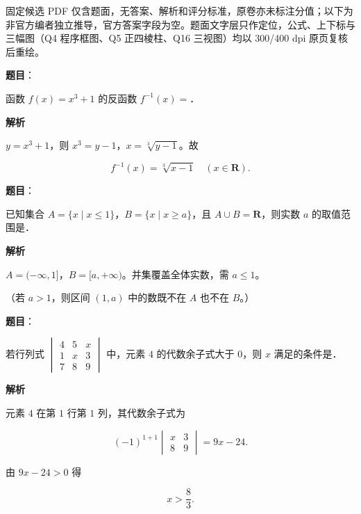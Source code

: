 

\begin{gktip}
固定候选 PDF 仅含题面，无答案、解析和评分标准，原卷亦未标注分值；以下为非官方编者独立推导，官方答案字段为空。题面文字层只作定位，公式、上下标与三幅图（Q4 程序框图、Q5 正四棱柱、Q16 三视图）均以 300/400 dpi 原页复核后重绘。
\end{gktip}

\begin{answer}

\textbf{题目}：

函数 $f(x)=x^3+1$ 的反函数 $f^{-1}(x)=$\gkblank{}．

\textbf{解析}

$y=x^3+1$，则 $x^3=y-1$，$x=\sqrt[3]{y-1}$。故

\nopagebreak[4]
\[f^{-1}(x)=\sqrt[3]{x-1}\quad(x\in\mathbf R).\]


\end{answer}
\begin{answer}

\textbf{题目}：

已知集合 $A=\{x\mid x\leqslant1\}$，$B=\{x\mid x\geqslant a\}$，且 $A\cup B=\mathbf R$，则实数 $a$ 的取值范围是\gkblank{}．

\textbf{解析}

$A=(-\infty,1]$，$B=[a,+\infty)$。并集覆盖全体实数，需 $a\leqslant1$。

（若 $a>1$，则区间 $(1,a)$ 中的数既不在 $A$ 也不在 $B$。）


\end{answer}
\begin{answer}

\textbf{题目}：

若行列式 $\begin{vmatrix}4&5&x\\1&x&3\\7&8&9\end{vmatrix}$ 中，元素 $4$ 的代数余子式大于 $0$，则 $x$ 满足的条件是\gkblank{}．

\textbf{解析}

元素 $4$ 在第 $1$ 行第 $1$ 列，其代数余子式为

\nopagebreak[4]
\[(-1)^{1+1}\begin{vmatrix}x&3\\8&9\end{vmatrix}=9x-24 .\]

由 $9x-24>0$ 得

\nopagebreak[4]
\[x>\frac83 .\]


\end{answer}

